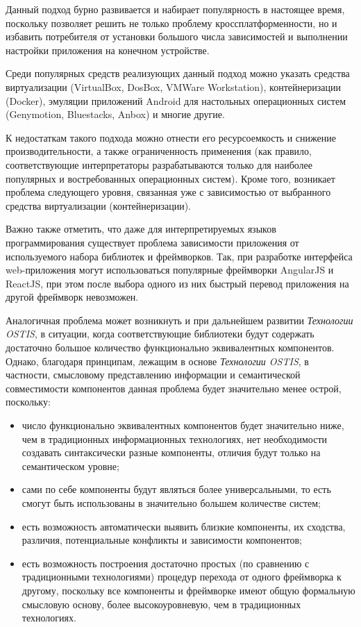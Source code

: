 \begin{itemize}
	Данный подход бурно развивается и набирает популярность в настоящее время, поскольку позволяет решить не только проблему кроссплатформенности, но и избавить потребителя от установки большого числа зависимостей и выполнении настройки приложения на конечном устройстве.
	
	Среди популярных средств реализующих данный подход можно указать средства виртуализации (VirtualBox, DosBox, VMWare Workstation), контейнеризации (Docker), эмуляции приложений Android для настольных операционных систем (Genymotion, Bluestacks, Anbox) и многие другие.
	
	К недостаткам такого подхода можно отнести его ресурсоемкость и снижение производительности, а также ограниченность применения (как правило, соответствующие интерпретаторы разрабатываются только для наиболее популярных и востребованных операционных систем). Кроме того, возникает проблема следующего уровня, связанная уже с зависимостью от выбранного средства виртуализации (контейнеризации).
\end{itemize}

Важно также отметить, что даже для интерпретируемых языков программирования существует проблема зависимости приложения от используемого набора библиотек и фреймворков. Так, при разработке интерфейса web-приложения могут использоваться популярные фреймворки AngularJS и ReactJS, при этом после выбора одного из них быстрый перевод приложения на другой фреймворк невозможен.

Аналогичная проблема может возникнуть и при дальнейшем развитии \textit{Технологии OSTIS}, в ситуации, когда соответствующие библиотеки будут содержать достаточно большое количество функционально эквивалентных компонентов. Однако, благодаря принципам, лежащим в основе \textit{Технологии OSTIS}, в частности, смысловому представлению информации и семантической совместимости компонентов данная проблема будет значительно менее острой, поскольку:
\begin{itemize}
	\item число функционально эквивалентных компонентов будет значительно ниже, чем в традиционных информационных технологиях, нет необходимости создавать синтаксически разные компоненты, отличия будут только на семантическом уровне;
	\item сами по себе компоненты будут являться более универсальными, то есть смогут быть использованы в значительно большем количестве систем;
	\item есть возможность автоматически выявить близкие компоненты, их сходства, различия, потенциальные конфликты и зависимости компонентов;
	\item есть возможность построения достаточно простых (по сравнению с традиционными технологиями) процедур перехода от одного фреймворка к другому, поскольку все компоненты и фреймворке имеют общую формальную смысловую основу, более высокоуровневую, чем в традиционных технологиях.
\end{itemize}

